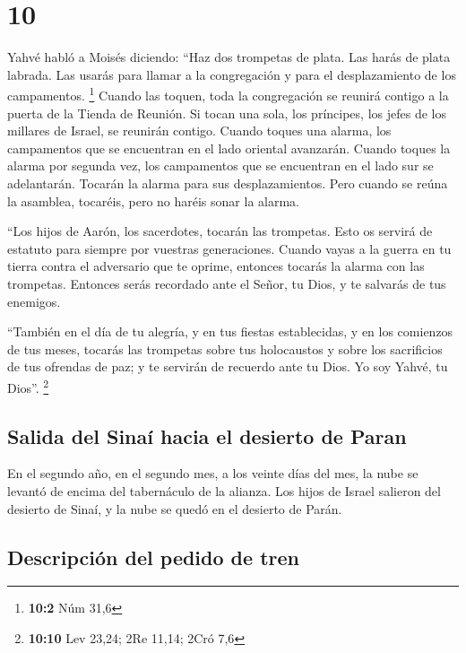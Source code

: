 \hypertarget{section-9}{%
\section{10}\label{section-9}}

 Yahvé habló a Moisés diciendo:  ``Haz dos
trompetas de plata. Las harás de plata labrada. Las usarás para llamar a
la congregación y para el desplazamiento de los campamentos. \footnote{\textbf{10:2}
  Núm 31,6}  Cuando las toquen, toda la congregación se
reunirá contigo a la puerta de la Tienda de Reunión.  Si
tocan una sola, los príncipes, los jefes de los millares de Israel, se
reunirán contigo.  Cuando toques una alarma, los
campamentos que se encuentran en el lado oriental avanzarán.
 Cuando toques la alarma por segunda vez, los campamentos
que se encuentran en el lado sur se adelantarán. Tocarán la alarma para
sus desplazamientos.  Pero cuando se reúna la asamblea,
tocaréis, pero no haréis sonar la alarma.

 ``Los hijos de Aarón, los sacerdotes, tocarán las
trompetas. Esto os servirá de estatuto para siempre por vuestras
generaciones.  Cuando vayas a la guerra en tu tierra
contra el adversario que te oprime, entonces tocarás la alarma con las
trompetas. Entonces serás recordado ante el Señor, tu Dios, y te
salvarás de tus enemigos.

 ``También en el día de tu alegría, y en tus fiestas
establecidas, y en los comienzos de tus meses, tocarás las trompetas
sobre tus holocaustos y sobre los sacrificios de tus ofrendas de paz; y
te servirán de recuerdo ante tu Dios. Yo soy Yahvé, tu Dios''.
\footnote{\textbf{10:10} Lev 23,24; 2Re 11,14; 2Cró 7,6}

\hypertarget{salida-del-sinauxed-hacia-el-desierto-de-paran}{%
\subsection{Salida del Sinaí hacia el desierto de
Paran}\label{salida-del-sinauxed-hacia-el-desierto-de-paran}}

 En el segundo año, en el segundo mes, a los veinte días
del mes, la nube se levantó de encima del tabernáculo de la alianza.
 Los hijos de Israel salieron del desierto de Sinaí, y la
nube se quedó en el desierto de Parán.

\hypertarget{descripciuxf3n-del-pedido-de-tren}{%
\subsection{Descripción del pedido de
tren}\label{descripciuxf3n-del-pedido-de-tren}}

